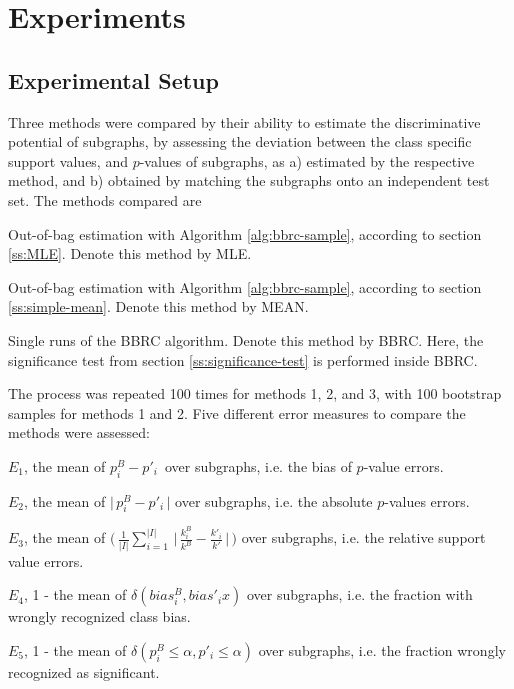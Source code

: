 \documentclass{article}
\begin{document}
\section{Experiments}
\label{s:Experiments}

\subsection{Experimental Setup} 
\label{ss:Error-estimation} 
Three methods were compared by their ability to estimate the discriminative
potential of subgraphs, by assessing the deviation between the class specific
support values, and $p$-values of subgraphs, as a) estimated by the respective
method, and b) obtained by matching the subgraphs onto an independent test set.
The methods compared are
\begin{enumerate*} 
  \item Out-of-bag estimation with Algorithm \ref{alg:bbrc-sample}, according
    to section \ref{ss:MLE}. Denote this method by MLE.
  \item Out-of-bag estimation with Algorithm \ref{alg:bbrc-sample}, according
    to section \ref{ss:simple-mean}. Denote this method by MEAN.
  \item Single runs of the BBRC algorithm. Denote this method by BBRC. Here,
    the significance test from section \ref{ss:significance-test} is performed
    inside BBRC.
\end{enumerate*}

The process was repeated 100 times for methods 1, 2, and 3, with 100 bootstrap samples for methods 1 
and 2. Five different error measures to compare the methods were assessed:
\begin{enumerate*}
  \item $E_1$, the mean of     $ p^B_i -p'_i \,$                                                                                    over subgraphs, i.e. the bias of $p$-value errors.
  \item $E_2$, the mean of     $ \Big|\,p^B_i -p'_i \,\Big|$                                                                        over subgraphs, i.e. the absolute $p$-values errors.
  \item $E_3$, the mean of     $ \Big(\,\frac{1}{|I|} \sum_{i=1}^{|I|} \,\Big|\,\frac{k^B_i}{k^B} - \frac{k'_i}{k'} \,\Big|\,\Big)$ over subgraphs, i.e. the relative support value errors.
  \item $E_4$, 1 - the mean of $ \delta(bias^B_i, bias'_ix)$                                                                        over subgraphs, i.e. the fraction with wrongly recognized class bias.
  \item $E_5$, 1 - the mean of $ \delta(p^B_i \le \alpha, p'_i \le \alpha)$                                                         over subgraphs, i.e. the fraction wrongly recognized as significant.
\end{enumerate*}
\end{document}
